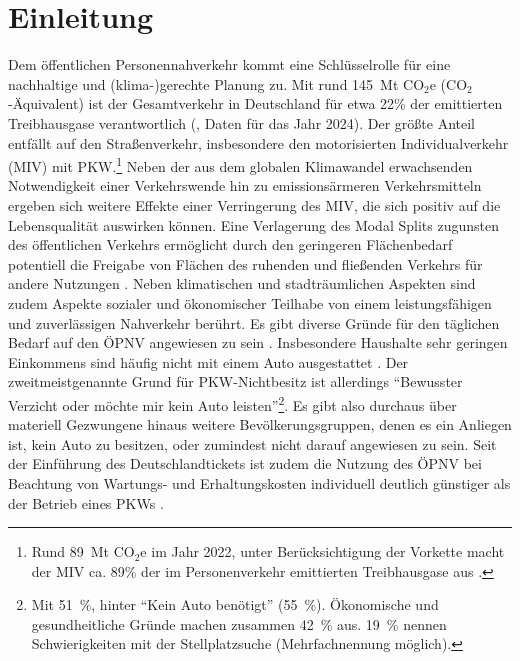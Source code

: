 \documentclass[11pt,pdftex,a4paper]{scrartcl}
\begin{document}
	\section{Einleitung}
	Dem öffentlichen Personennahverkehr kommt eine Schlüsselrolle für eine nachhaltige und (klima-)gerechte Planung zu. Mit rund \SI{145}{\mega\tonne} $\text{CO}_2\text{e}$ (CO$_2$-Äquivalent) ist der Gesamtverkehr in Deutschland für etwa 22\% der emittierten Treibhausgase verantwortlich (\textcite{UBAEmissionenVerkehr2026}, Daten für das Jahr 2024). Der größte Anteil entfällt auf den Straßenverkehr, insbesondere den motorisierten Individualverkehr (MIV) mit PKW.\footnote{Rund \SI{89}{\mega\tonne} $\text{CO}_2\text{e}$ im Jahr 2022, unter Berücksichtigung der Vorkette macht der MIV ca. 89\% der im Personenverkehr emittierten Treibhausgase aus \parencite[314, 318]{BMDVVerkehrZahlen2024}.} Neben der aus dem globalen Klimawandel erwachsenden Notwendigkeit einer Verkehrswende hin zu emissionsärmeren Verkehrsmitteln ergeben sich weitere Effekte einer Verringerung des MIV, die sich positiv auf die Lebensqualität auswirken können. Eine Verlagerung des Modal Splits zugunsten des öffentlichen Verkehrs ermöglicht durch den geringeren Flächenbedarf potentiell die Freigabe von Flächen des ruhenden und fließenden Verkehrs für andere Nutzungen \parencite[vgl.][]{dlr196674}. Neben klimatischen und stadträumlichen Aspekten sind zudem Aspekte sozialer und ökonomischer Teilhabe von einem leistungsfähigen und zuverlässigen Nahverkehr berührt. Es gibt diverse Gründe für den täglichen Bedarf auf den ÖPNV angewiesen zu sein \parencite[Tabellen B H4 und B H9.2]{infasMobilitatDeutschlandMiD2025}. Insbesondere Haushalte sehr geringen Einkommens sind häufig nicht mit einem Auto ausgestattet \parencite[Tabelle A H7]{infasMobilitatDeutschlandMiD2025}. Der zweitmeistgenannte Grund für PKW-Nichtbesitz ist allerdings \enquote{Bewusster Verzicht oder möchte mir kein Auto leisten}\footnote{Mit \SI{51}{\percent}, hinter \enquote{Kein Auto benötigt} (\SI{55}{\percent}). Ökonomische und gesundheitliche Gründe machen zusammen \SI{42}{\percent} aus. \SI{19}{\percent} nennen Schwierigkeiten mit der Stellplatzsuche (Mehrfachnennung möglich).}. Es gibt also durchaus über materiell Gezwungene hinaus weitere Bevölkerungsgruppen, denen es ein Anliegen ist, kein Auto zu besitzen, oder zumindest nicht darauf angewiesen zu sein. Seit der Einführung des Deutschlandtickets ist zudem die Nutzung des ÖPNV bei Beachtung von Wartungs- und Erhaltungskosten individuell deutlich günstiger als der Betrieb eines PKWs \parencite[vgl.][]{PeiselerMIVÖPNVKosten2024}.
	
\end{document}
